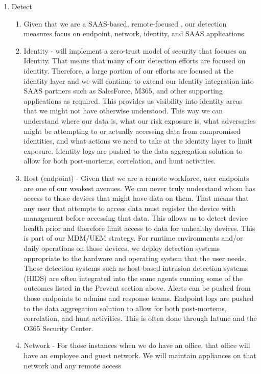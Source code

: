 \documentclass[../main.tex]{subfiles}
\begin{document}
\begin{enumerate}
    \item Detect
    \begin{enumerate}
        \item Given that we are a SAAS-based, remote-focused \CompanyName, our detection measures focus on endpoint, network, identity, and SAAS applications.
        \item Identity - \CompanyName will implement a zero-trust model of security that focuses on Identity. That means that many of our detection efforts are focused on identity.
        Therefore, a large portion of our efforts are focused at the identity layer and we will continue to extend our identity integration into SAAS partners such as SalesForce, M365,
        and other supporting applications as required. This provides us visibility into identity areas that we might not have otherwise understood. This way we can understand where our data is,
        what our risk exposure is, what adversaries might be attempting to or actually accessing data from compromised identities, and what actions we need to take at the identity layer to limit
        exposure. Identity logs are pushed to the data aggregation solution to allow for both post-mortems, correlation, and hunt activities.
        \item Host (endpoint) - Given that we are a remote workforce, user endpoints are one of our weakest avenues.  We can never truly understand whom has access to those devices that might
        have \CompanyName data on them. That means that any user that attempts to access \CompanyName data must register the device with \CompanyName management before accessing that data. This allows us to
        detect device health prior and therefore limit access to data for unhealthy devices. This is part of our MDM/UEM strategy. For runtime environments and/or daily operations on those devices,
        we deploy detection systems appropriate to the hardware and operating system that the user needs. Those detection systems such as host-based intrusion detection systems (HIDS) are often
        integrated into the same agents running some of the outcomes listed in the Prevent section above. Alerts can be pushed from those endpoints to admins and response teams. Endpoint logs are
        pushed to the data aggregation solution to allow for both post-mortems, correlation, and hunt activities. This is often done through Intune and the O365 Security Center.
        \item Network - For those instances when we do have an office, that office will have an employee and guest network. We will maintain appliances on that network and any remote access

\end{enumerate}
\end{enumerate}
\end{document}
